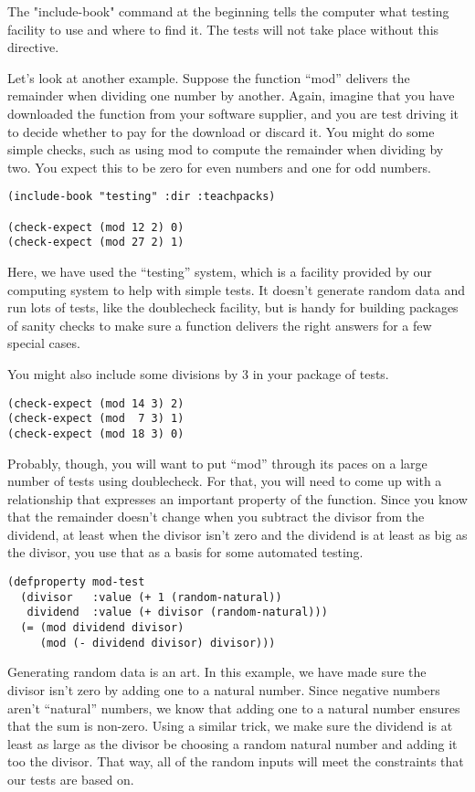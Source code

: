 The "include-book" command at the beginning tells the computer what testing facility to use and where to find it. The tests will not take place without this directive.

Let's look at another example. Suppose the function ``mod''
\label{mod-function}
delivers the remainder when dividing one number by another. Again, imagine that you have downloaded the function from your software supplier, and you are test driving it to decide whether to pay for the download or discard it. You might do some simple checks, such as using mod to compute the remainder when dividing by two. You expect this to be zero for even numbers and one for odd numbers.

\begin{lstlisting}
(include-book "testing" :dir :teachpacks)

(check-expect (mod 12 2) 0)
(check-expect (mod 27 2) 1)
\end{lstlisting}

Here, we have used the ``testing'' system, which is a facility provided by our computing system to help with simple tests. It doesn't generate random data and run lots of tests, like the doublecheck facility, but is handy for building packages of sanity checks to make sure a function delivers the right answers for a few special cases.

You might also include some divisions by 3 in your package of tests.

\begin{lstlisting}
(check-expect (mod 14 3) 2)
(check-expect (mod  7 3) 1)
(check-expect (mod 18 3) 0)
\end{lstlisting}

Probably, though, you will want to put ``mod'' through its paces on a large number of tests using doublecheck. For that, you will need to come up with a relationship that expresses an important property of the function. Since you know that the remainder doesn't change when you subtract the divisor from the dividend, at least when the divisor isn't zero and the dividend is at least as big as the divisor, you use that as a basis for some automated testing.

\begin{lstlisting}
(defproperty mod-test
  (divisor   :value (+ 1 (random-natural))
   dividend  :value (+ divisor (random-natural)))
  (= (mod dividend divisor)
     (mod (- dividend divisor) divisor)))
\end{lstlisting}

Generating random data is an art. In this example, we have made sure the divisor isn't zero by adding one to a natural number. Since negative numbers aren't ``natural'' numbers, we know that adding one to a natural number ensures that the sum is non-zero. Using a similar trick, we make sure the dividend is at least as large as the divisor be choosing a random natural number and adding it too the divisor. That way, all of the random inputs will meet the constraints that our tests are based on.


